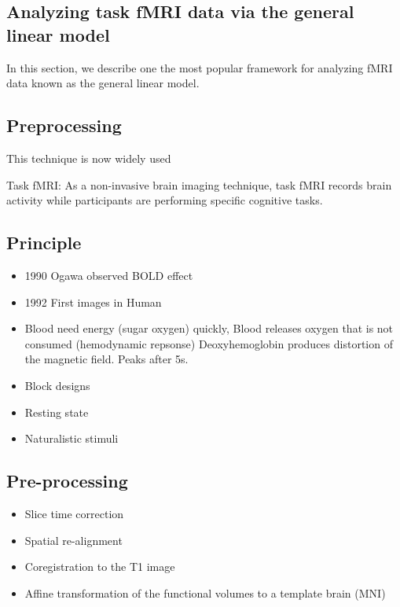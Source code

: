 \subsection{Analyzing task fMRI data via the general linear model}
In this section, we describe one the most popular framework for analyzing fMRI data known as the general linear model.










\subsection{Preprocessing}


This technique is now widely used 



Task fMRI:
As a non-invasive brain imaging technique, task fMRI records brain
activity while participants are
performing specific cognitive tasks.

\subsection{Principle}
\begin{itemize}
\item 1990 Ogawa observed BOLD effect
\item 1992 First images in Human
  \item Blood need energy (sugar oxygen) quickly, Blood releases oxygen that is
    not consumed (hemodynamic repsonse) Deoxyhemoglobin produces distortion of
    the magnetic field. Peaks after 5s.
  \item Block designs
  \item Resting state
    \item Naturalistic stimuli
\end{itemize}
\subsection{Pre-processing}
\begin{itemize}
\item Slice time correction
\item Spatial re-alignment
\item Coregistration to the T1 image
\item Affine transformation of the functional volumes to a template brain (MNI)
\end{itemize}

